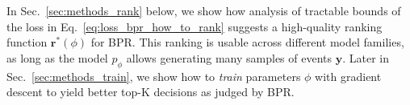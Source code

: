 In Sec.~\ref{sec:methods_rank} below, we show how analysis of tractable bounds of the loss in Eq.~\eqref{eq:loss_bpr_how_to_rank} suggests a high-quality ranking function $\bm{r}^*(\phi)$ for BPR. This ranking is usable across different model families, as long as the model $p_\phi$ allows generating many samples of events $\bm{y}$.
Later in Sec.~\ref{sec:methods_train}, we show how to \emph{train} parameters $\phi$ with gradient descent to yield better top-K decisions as judged by BPR.


